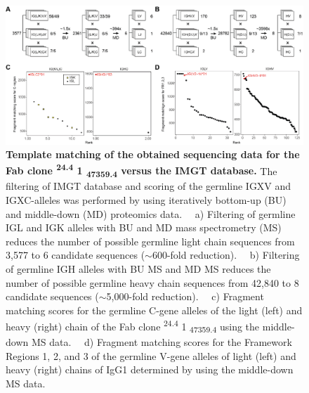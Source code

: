 \begin{subappendices}
  \vspace{1cm}
  \begin{figure}[!hbt]
    \center
    \includegraphics[]{Chapter.3/Figures/fs5.png}
    \caption{
      \textbf{Template matching of the obtained sequencing data for the Fab clone \textsuperscript{24.4} 1 \textsubscript{47359.4} versus the IMGT database.} The filtering of IMGT database and scoring of the germline IGXV and IGXC-alleles was performed by using iteratively bottom-up (BU) and middle-down (MD) proteomics data. ~~a) Filtering of germline IGL and IGK alleles with BU and MD mass spectrometry (MS) reduces the number of possible germline light chain sequences from 3,577 to 6 candidate sequences ($\sim$600-fold reduction). ~~b) Filtering of germline IGH alleles with BU MS and MD MS reduces the number of possible germline heavy chain sequences from 42,840 to 8 candidate sequences ($\sim$5,000-fold reduction). ~~c) Fragment matching scores for the germline C-gene alleles of the light (left) and heavy (right) chain of the Fab clone \textsuperscript{24.4} 1 \textsubscript{47359.4} using the middle-down MS data. ~~d) Fragment matching scores for the Framework Regions 1, 2, and 3 of the germline V-gene alleles of light (left) and heavy (right) chains of IgG1 determined by using the middle-down MS data.
    }
    \label{fig:figs3.5}
  \end{figure}

  \vspace{1cm}


\end{subappendices}
